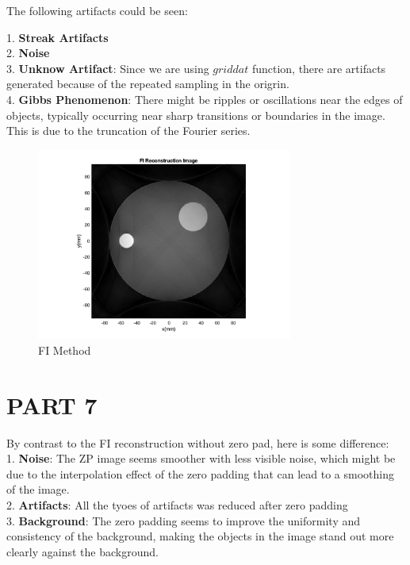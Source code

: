 \documentclass{report}
\begin{document}
The following artifacts could be seen:

1. \textbf{Streak Artifacts}\\
2. \textbf{Noise}\\
3. \textbf{Unknow Artifact}: Since we are using $griddat$ function, there are artifacts generated because of the
repeated sampling in the origrin.\\
4. \textbf{Gibbs Phenomenon}: There might be ripples or oscillations near the edges of objects,
typically occurring near sharp transitions or boundaries in the image. This is due to the truncation of the Fourier series.
\begin{figure}[hb]
    \centering
    \includegraphics[width=0.75\textwidth]{6.png}
    \caption{FI Method}
\end{figure}
\newpage 
\section[short]{PART 7}
By contrast to the FI reconstruction without zero pad, here is some difference:\\

1. \textbf{Noise}: The ZP image seems smoother with less visible noise, which might be due to the 
interpolation effect of the zero padding that can lead to a smoothing of the image.\\

2. \textbf{Artifacts}: All the tyoes of artifacts was reduced after zero padding\\

3. \textbf{Background}: The zero padding seems to improve the uniformity and consistency of the background, 
making the objects in the image stand out more clearly against the background.\\
\end{document}

